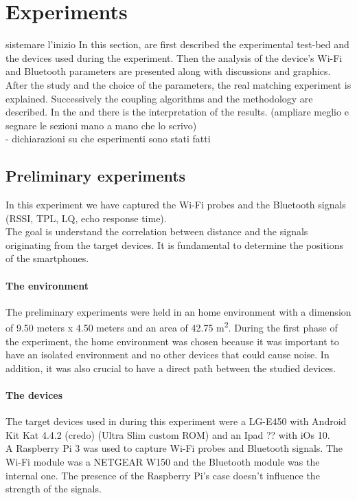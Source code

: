 \chapter{Experiments}
\label{capitolo5}
\thispagestyle{empty}
sistemare l'inizio
In this section, are first described the experimental test-bed and the devices used during the experiment. Then the analysis of the device's Wi-Fi and Bluetooth parameters are presented along with discussions and graphics. After the study and the choice of the parameters, the real matching experiment is explained. Successively the coupling algorithms and the methodology are described. In the and there is the interpretation of the results. (ampliare meglio e segnare le sezioni mano a mano che lo scrivo)\\

- dichiarazioni su che esperimenti sono stati fatti

\section{Preliminary experiments}
In this experiment we have captured the Wi-Fi probes and the Bluetooth signals (RSSI, TPL, LQ, echo response time).\\
The goal is understand the correlation between distance and the signals originating from the target devices. It is fundamental to determine the positions of the smartphones.
\subsubsection{The environment}
The preliminary experiments were held in an home environment with a dimension of 9.50 meters x 4.50 meters and an area of 42.75 m\textsuperscript{2}.
During the first phase of the experiment, the home environment was chosen because it was important to have an isolated environment and no other devices that could cause noise. In addition, it was also crucial to have a direct path between the studied devices.\\
\subsubsection{The devices}
The target devices used in during this experiment were a LG-E450 with Android Kit Kat 4.4.2 (credo) (Ultra Slim custom ROM) and an Ipad ?? with iOs 10. \\
\linebreak
A Raspberry Pi 3 was used to capture Wi-Fi probes and Bluetooth signals. The Wi-Fi module was a NETGEAR W150 and the Bluetooth module was the internal one. The presence of the Raspberry Pi's case doesn't influence the strength of the signals.
